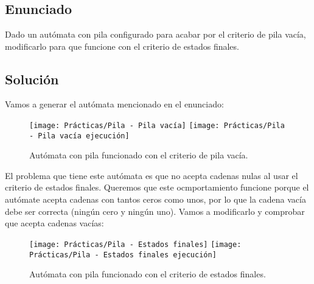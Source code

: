 \chapter{}

\section{Enunciado}

Dado un autómata con pila configurado para acabar por el criterio de pila vacía, modificarlo para que funcione con el criterio de estados finales.

\section{Solución}

Vamos a generar el autómata mencionado en el enunciado:

\begin{figure}[h!]
\begin{center}
	\texttt{[image: Prácticas/Pila - Pila vacía]}
	\texttt{[image: Prácticas/Pila - Pila vacía ejecución]}
\end{center}
\caption{Autómata con pila funcionado con el criterio de pila vacía.}
\end{figure}

El problema que tiene este autómata es que no acepta cadenas nulas al usar el criterio de estados finales.
Queremos que este ocmportamiento funcione porque el autómate acepta cadenas con tantos ceros como unos, por lo que la cadena vacía debe ser correcta (ningún cero y ningún uno).
Vamos a modificarlo y comprobar que acepta cadenas vacías:

\begin{figure}[h!]
\begin{center}
	\texttt{[image: Prácticas/Pila - Estados finales]}
	\texttt{[image: Prácticas/Pila - Estados finales ejecución]}
\end{center}
\caption{Autómata con pila funcionado con el criterio de estados finales.}
\end{figure}
